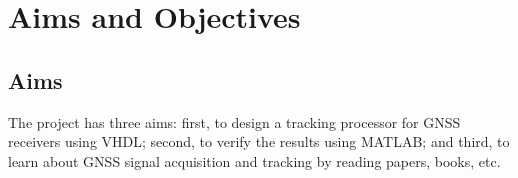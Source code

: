 

\section{Aims and Objectives}
\subsection{Aims}
The project has three aims: first, to design a tracking processor for GNSS receivers using VHDL; second, to verify the results using MATLAB; and third, to learn about GNSS signal acquisition and tracking by reading papers, books, etc.

